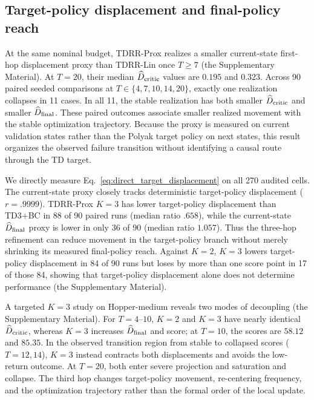 \documentclass[letterpaper]{article}
\begin{document}
\subsection{Target-policy displacement and final-policy reach}

At the same nominal budget, TDRR-Prox realizes a smaller current-state first-hop
displacement proxy than TDRR-Lin once $T\ge7$ (the Supplementary Material). At
$T=20$, their median $\widehat D_{\rm critic}$ values are $0.195$ and $0.323$.
Across 90 paired seeded comparisons at $T\in\{4,7,10,14,20\}$, exactly one
realization collapses in 11 cases. In all 11, the stable realization has both
smaller $\widehat D_{\rm critic}$ and smaller $\widehat D_{\rm final}$.
These paired outcomes associate smaller realized movement with the stable
optimization trajectory. Because the proxy is measured on current validation
states rather than the Polyak target policy on next states, this result
organizes the observed failure transition without identifying a causal route
through the TD target.

We directly measure Eq.~\eqref{eq:direct_target_displacement} on all 270
audited cells. The current-state proxy closely tracks deterministic
target-policy displacement ($r=.9999$). TDRR-Prox $K=3$ has lower target-policy
displacement than TD3+BC in 88 of 90 paired runs (median ratio $.658$), while
the current-state $\widehat D_{\rm final}$ proxy is lower in only 36 of 90
(median ratio $1.057$). Thus the three-hop refinement can reduce movement in
the target-policy branch without merely shrinking its measured final-policy
reach. Against $K=2$, $K=3$ lowers target-policy
displacement in 84 of 90 runs but loses by more than one score point in 17 of
those 84, showing that target-policy displacement alone does not determine
performance (the Supplementary Material).

A targeted $K=3$ study on Hopper-medium reveals two modes of decoupling
(the Supplementary Material). For $T=4$--$10$, $K=2$ and $K=3$ have nearly
identical $\widehat D_{\rm critic}$, whereas $K=3$ increases
$\widehat D_{\rm final}$ and score;
at $T=10$, the scores are $58.12$ and $85.35$. In the observed transition
region from stable to collapsed scores ($T=12,14$), $K=3$ instead contracts
both displacements and avoids the low-return outcome.
At $T=20$, both enter severe projection and saturation and collapse. The third
hop changes target-policy movement, re-centering frequency, and the
optimization trajectory rather than the formal order of the local update.
\end{document}
